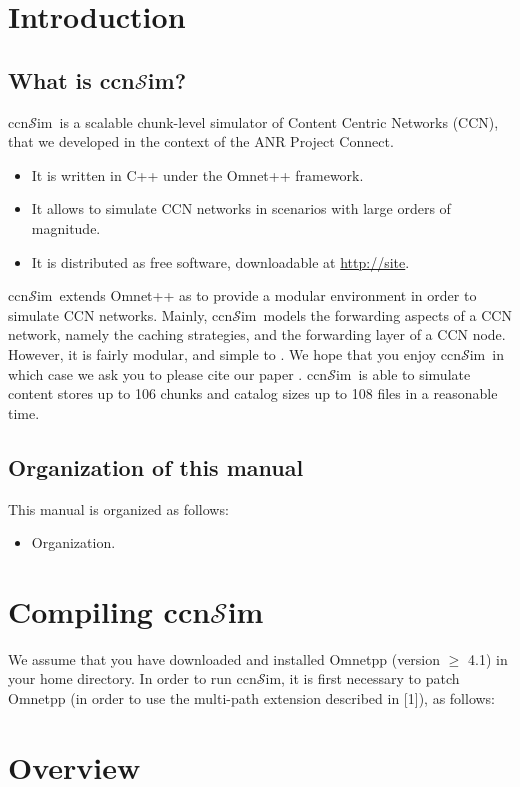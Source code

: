 \documentclass{article}
\newcommand{\ccnsim}{ccn$\mathcal{S}$im}
\begin{document}
\section{Introduction}
\subsection{What is \ccnsim?}
\ccnsim\ is a scalable chunk-level simulator of Content Centric Networks (CCN)\cite{jacobson09conext}, that we developed in the context of the ANR Project Connect.  

\begin{itemize}
    \item It is written in C++ under the Omnet++ framework.
    \item It  allows to simulate CCN networks in scenarios with large orders of magnitude.
    \item It is distributed as free software, downloadable at \url{http://site}.
\end{itemize}
\ccnsim\ extends Omnet++ as to provide a modular environment in order to simulate CCN networks. Mainly,  \ccnsim\ models the forwarding aspects of a CCN network, namely the caching strategies, and the forwarding layer of a CCN node. However, it is fairly modular, and simple to . We hope that you enjoy \ccnsim\, in which case we ask you to please cite our paper \cite{ccn12icc}. 
\ccnsim\ is able to simulate content stores up to 106 chunks and catalog sizes up to 108 files in a reasonable time.  
\subsection{Organization of this manual}
This manual is organized as follows:
\begin{itemize}
    \item Organization.
\end{itemize}


\section{Compiling \ccnsim}
We assume that you have downloaded and installed Omnetpp (version $\geq$ 4.1) in your home directory. In order to run \ccnsim, it is first necessary to patch Omnetpp (in order to use the multi-path extension described in [1]), as follows:
\section{Overview}
\end{document}
